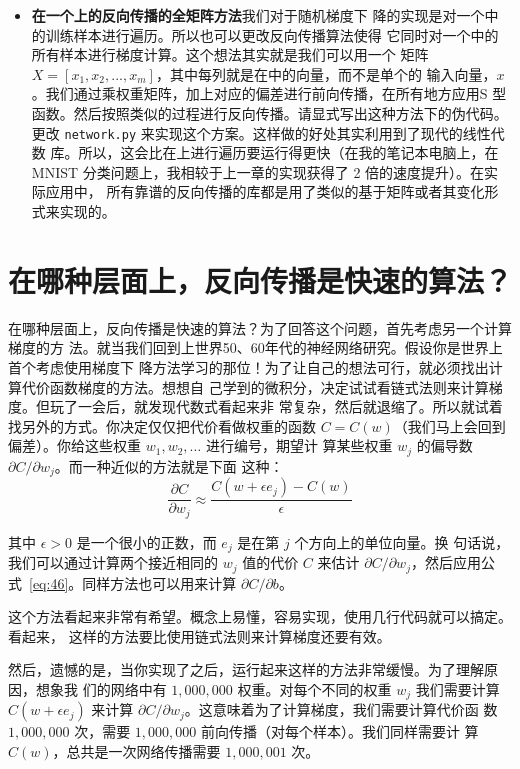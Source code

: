 \begin{itemize}
\item \textbf{在一个\minibatch{}上的反向传播的全矩阵方法}\quad 我们对于随机梯度下
  降的实现是对一个\minibatch{}中的训练样本进行遍历。所以也可以更改反向传播算法使得
  它同时对一个\minibatch{}中的所有样本进行梯度计算。这个想法其实就是我们可以用一个
  矩阵 $X=[x_1, x_2, ..., x_m]$，其中每列就是在\minibatch{}中的向量，而不是单个的
  输入向量，$x$。我们通过乘权重矩阵，加上对应的偏差进行前向传播，在所有地方应用S
  型函数。然后按照类似的过程进行反向传播。请显式写出这种方法下的伪代码。更改
  \lstinline!network.py! 来实现这个方案。这样做的好处其实利用到了现代的线性代数
  库。所以，这会比在\minibatch{}上进行遍历要运行得更快（在我的笔记本电脑上，在
    MNIST 分类问题上，我相较于上一章的实现获得了 2 倍的速度提升）。在实际应用中，
  所有靠谱的反向传播的库都是用了类似的基于矩阵或者其变化形式来实现的。
\end{itemize}

\section{在哪种层面上，反向传播是快速的算法？}

在哪种层面上，反向传播是快速的算法？为了回答这个问题，首先考虑另一个计算梯度的方
法。就当我们回到上世界50、60年代的神经网络研究。假设你是世界上首个考虑使用梯度下
降方法学习的那位！为了让自己的想法可行，就必须找出计算代价函数梯度的方法。想想自
己学到的微积分，决定试试看链式法则来计算梯度。但玩了一会后，就发现代数式看起来非
常复杂，然后就退缩了。所以就试着找另外的方式。你决定仅仅把代价看做权重的函数 $C
= C(w)$（我们马上会回到偏差）。你给这些权重 $w_1, w_2, \ldots$ 进行编号，期望计
算某些权重 $w_j$ 的偏导数 $\partial C / \partial w_j$。而一种近似的方法就是下面
这种：
\begin{equation}
  \frac{\partial
    C}{\partial w_{j}} \approx \frac{C(w+\epsilon
    e_j)-C(w)}{\epsilon}
  \label{eq:46}\tag{46}
\end{equation}

其中 $\epsilon > 0$ 是一个很小的正数，而 $e_j$ 是在第 $j$ 个方向上的单位向量。换
句话说，我们可以通过计算两个接近相同的 $w_j$ 值的代价 $C$ 来估计 $\partial
C/\partial w_j$，然后应用公式~\eqref{eq:46}。同样方法也可以用来计算 $\partial
C/\partial b$。

这个方法看起来非常有希望。概念上易懂，容易实现，使用几行代码就可以搞定。看起来，
这样的方法要比使用链式法则来计算梯度还要有效。

然后，遗憾的是，当你实现了之后，运行起来这样的方法非常缓慢。为了理解原因，想象我
们的网络中有 $1,000,000$ 权重。对每个不同的权重 $w_j$ 我们需要计算 $C(w+\epsilon
e_j)$ 来计算 $\partial C/\partial w_j$。这意味着为了计算梯度，我们需要计算代价函
数 $1, 000, 000 $ 次，需要 $1, 000, 000$ 前向传播（对每个样本）。我们同样需要计
算 $C(w)$，总共是一次网络传播需要 $1,000,001$ 次。

